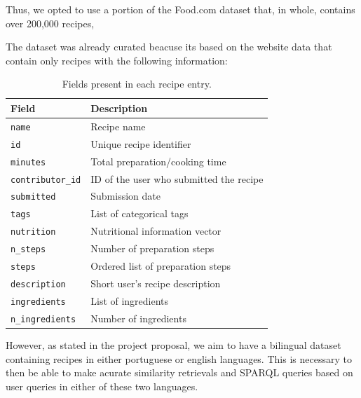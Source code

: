 \documentclass{article}
\begin{document}
\noindent
Thus, we opted to use a portion of the Food.com \cite{foodcom_kaggle} dataset that, in whole, contains over 200,000 recipes, 

\noindent
The dataset was already curated beacuse its based on the website data that contain only recipes with the following information:

\begin{table}[h!]
\centering
\scriptsize
\caption{Fields present in each recipe entry.}
\label{tab:recipe-fields}
\begin{tabularx}{\columnwidth}{@{} l @{\hspace{1.5em}} Y @{}}
\toprule
\textbf{Field} & \textbf{Description} \\
\midrule
\texttt{name} & Recipe name \\
\texttt{id} & Unique recipe identifier \\
\texttt{minutes} & Total preparation/cooking time \\
\texttt{contributor\_id} & ID of the user who submitted the recipe \\
\texttt{submitted} & Submission date \\
\texttt{tags} & List of categorical tags \\
\texttt{nutrition} & Nutritional information vector \\
\texttt{n\_steps} & Number of preparation steps \\
\texttt{steps} & Ordered list of preparation steps \\
\texttt{description} & Short user's recipe description \\
\texttt{ingredients} & List of ingredients \\
\texttt{n\_ingredients} & Number of ingredients \\
\bottomrule
\end{tabularx}
\end{table}


\noindent
However, as stated in the project proposal, we aim to have a bilingual dataset containing recipes in either portuguese or english languages. This is necessary to then be able to make acurate similarity retrievals and SPARQL queries based on user queries in either of these two languages.
\end{document}
